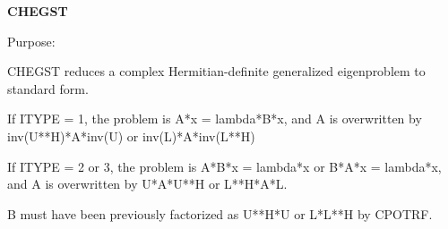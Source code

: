 {\bfseries C\+H\+E\+G\+S\+T} 

 \begin{DoxyParagraph}{Purpose\+: }
\begin{DoxyVerb} CHEGST reduces a complex Hermitian-definite generalized
 eigenproblem to standard form.

 If ITYPE = 1, the problem is A*x = lambda*B*x,
 and A is overwritten by inv(U**H)*A*inv(U) or inv(L)*A*inv(L**H)

 If ITYPE = 2 or 3, the problem is A*B*x = lambda*x or
 B*A*x = lambda*x, and A is overwritten by U*A*U**H or L**H*A*L.

 B must have been previously factorized as U**H*U or L*L**H by CPOTRF.\end{DoxyVerb}
 
\end{DoxyParagraph}

